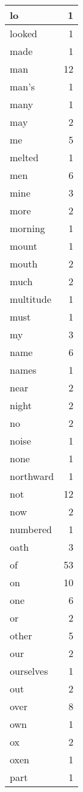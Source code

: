 \begin{center}
\begin{longtable}{l|r}
lo & 1 \\ \hline
looked & 1 \\ \hline
made & 1 \\ \hline
man & 12 \\ \hline
man's & 1 \\ \hline
many & 1 \\ \hline
may & 2 \\ \hline
me & 5 \\ \hline
melted & 1 \\ \hline
men & 6 \\ \hline
mine & 3 \\ \hline
more & 2 \\ \hline
morning & 1 \\ \hline
mount & 1 \\ \hline
mouth & 2 \\ \hline
much & 2 \\ \hline
multitude & 1 \\ \hline
must & 1 \\ \hline
my & 3 \\ \hline
name & 6 \\ \hline
names & 1 \\ \hline
near & 2 \\ \hline
night & 2 \\ \hline
no & 2 \\ \hline
noise & 1 \\ \hline
none & 1 \\ \hline
northward & 1 \\ \hline
not & 12 \\ \hline
now & 2 \\ \hline
numbered & 1 \\ \hline
oath & 3 \\ \hline
of & 53 \\ \hline
on & 10 \\ \hline
one & 6 \\ \hline
or & 2 \\ \hline
other & 5 \\ \hline
our & 2 \\ \hline
ourselves & 1 \\ \hline
out & 2 \\ \hline
over & 8 \\ \hline
own & 1 \\ \hline
ox & 2 \\ \hline
oxen & 1 \\ \hline
part & 1 \\ \hline

\end{longtable}
\end{center}
